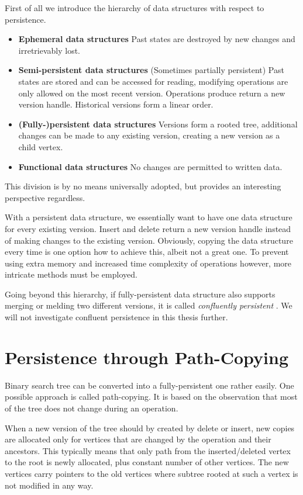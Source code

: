 First of all we introduce the hierarchy of data structures with respect to persistence.

\begin{itemize}
\item {\bfseries Ephemeral data structures} Past states are destroyed by new changes and irretrievably lost.
\item {\bfseries Semi-persistent data structures} (Sometimes partially persistent) Past states are stored and can be accessed for reading, modifying operations are only allowed on the most recent version. Operations produce return a new version handle. Historical versions form a linear order.
\item {\bfseries (Fully-)persistent data structures} Versions form a rooted tree, additional changes can be made to any existing version, creating a new version as a child vertex.
\item {\bfseries Functional data structures} No changes are permitted to written data.
\end{itemize}

This division is by no means universally adopted, but provides an interesting perspective regardless.

With a persistent data structure, we essentially want to have one data structure for every existing version. Insert and delete return a new version handle instead of making changes to the existing version. Obviously, copying the data structure every time is one option how to achieve this, albeit not a great one. To prevent using extra memory and increased time complexity of operations however, more intricate methods must be employed.

Going beyond this hierarchy, if fully-persistent data structure also supports merging or melding two different versions, it is called \textit{confluently persistent} \cite{confluently-persistent}. We will not investigate confluent persistence in this thesis further.

\section{Persistence through Path-Copying}

Binary search tree can be converted into a fully-persistent one rather easily.
One possible approach is called path-copying. It is based on the observation that most of the tree does not change during an operation.

When a new version of the tree should by created by delete or insert, new copies are allocated only for vertices that are changed by the operation and their ancestors. This typically means that only path from the inserted/deleted vertex to the root is newly allocated, plus constant number of other vertices. The new vertices carry pointers to the old vertices where subtree rooted at such a vertex is not modified in any way.

